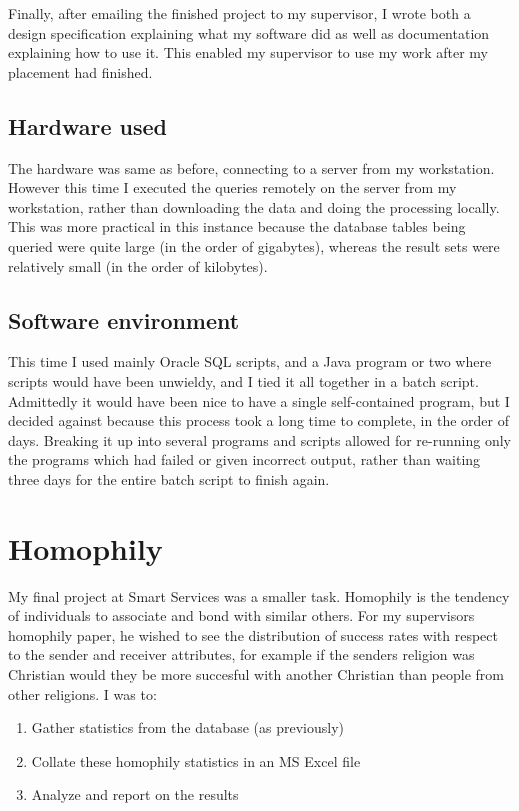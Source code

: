 \documentclass{report}
\begin{document}
Finally, after emailing the finished project to my supervisor, I wrote both a design specification explaining what my software did as well as documentation explaining how to use it. This enabled my supervisor to use my work after my placement had finished.

\subsection{Hardware used}
The hardware was same as before, connecting to a server from my workstation. However this time I executed the queries remotely on the server from my workstation, rather than downloading the data and doing the processing locally. This was more practical in this instance because the database tables being queried were quite large (in the order of gigabytes), whereas the result sets were relatively small (in the order of kilobytes).

\subsection{Software environment}
This time I used mainly Oracle SQL scripts, and a Java program or two where scripts would have been unwieldy, and I tied it all together in a batch script. Admittedly it would have been nice to have a single self-contained program, but I decided against because this process took a long time to complete, in the order of days. Breaking it up into several programs and scripts allowed for re-running only the programs which had failed or given incorrect output, rather than waiting three days for the entire batch script to finish again.

\section{Homophily}

My final project at Smart Services was a smaller task. Homophily is the tendency of individuals to associate and bond with similar others. For my supervisors homophily paper, he wished to see the distribution of success rates with respect to the sender and receiver attributes, for example if the senders religion was Christian would they be more succesful with another Christian than people from other religions. I was to:
\begin{enumerate}
  \item Gather statistics from the database (as previously)
  \item Collate these homophily statistics in an MS Excel file
  \item Analyze and report on the results
\end{enumerate}
\end{document}

